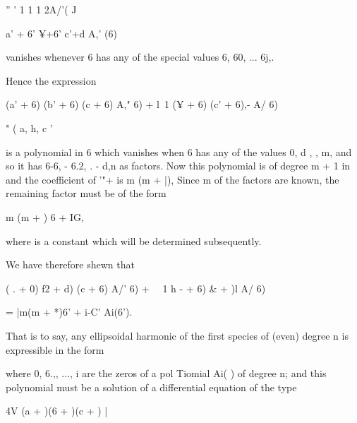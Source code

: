 '' ' 1 1 1 2A/'( J

a' + 6' ¥+6' c'+d A,' (6)

vanishes whenever 6 has any of the special values 6, 60, ... 6j,.

Hence the expression

(a' + 6) (b' + 6) (c + 6) A," 6) + l\ 1 (¥ + 6) (c' + 6),- A/ 6)

" ( a, h, c '

%
%

is a polynomial in 6 which vanishes when 6 has any of the values 0, d
, , m, and so it has 6-6, - 6.2, . - d,n as factors. Now this
polynomial is of degree m + 1 in and the coefficient of '"+ is m (m +
|), Since m of the factors are known, the remaining factor must be of
the form

m (m + ) 6 + IG,

where is a constant which will be determined subsequently.

We have therefore shewn that

( . + 0) f2 + d) (c + 6) A/' 6) + \ \ 1 h - + 6) \& + )l A/ 6)

= |m(m + *)6' + i-C' Ai(6').

That is to say, any ellipsoidal harmonic of the first species of
(even) degree n is expressible in the form

where 0, 6.,, ..., i are the zeros of a pol Tiomial Ai( ) of degree
n; and this polynomial must be a solution of a differential equation
of the type

4V (a + )(6 + )(c + ) |

